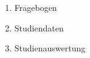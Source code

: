 
\addchap{\langanhang}

{\Large
\begin{enumerate}[label=\Alph*.]
    \item Fragebogen
    \item Studiendaten
    \item Studienauswertung
\end{enumerate}

% 
% 
%
}
\pagebreak
\pagebreak


